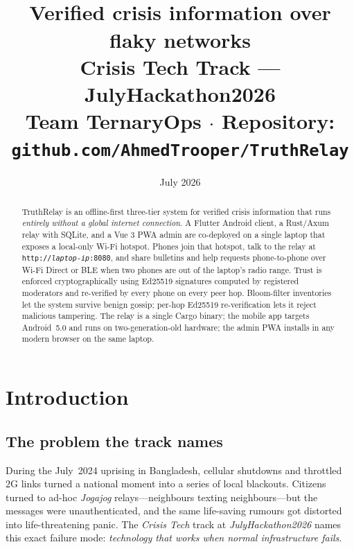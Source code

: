 \documentclass[11pt,a4paper]{article}
\title{
  \vspace{-2cm}
  {\Huge\bfseries \projectname\\[0.2cm]}
  \large Verified crisis information over flaky networks\\[0.4cm]
  \normalsize Crisis Tech Track --- JulyHackathon2026\\[0.2cm]
  \small Team TernaryOps $\cdot$ Repository: \texttt{github.com/AhmedTrooper/TruthRelay}
}
\author{}
\date{July 2026}
\newcommand{\projectname}{TruthRelay}
\begin{document}
\maketitle

\begin{abstract}
\noindent
\projectname{} is an offline-first three-tier system for verified
crisis information that runs \emph{entirely without a global internet
connection}. A Flutter Android client, a Rust/Axum relay with
SQLite, and a Vue 3 PWA admin are co-deployed on a single laptop
that exposes a local-only Wi-Fi hotspot. Phones join that hotspot,
talk to the relay at \texttt{http://\emph{laptop-ip}:8080}, and
share bulletins and help requests phone-to-phone over Wi-Fi Direct
or BLE when two phones are out of the laptop's radio range. Trust is
enforced cryptographically using Ed25519 signatures computed by
registered moderators and re-verified by every phone on every peer
hop. Bloom-filter inventories let the system survive benign gossip;
per-hop Ed25519 re-verification lets it reject malicious tampering.
The relay is a single Cargo binary; the mobile app targets
Android~5.0 and runs on two-generation-old hardware; the admin PWA
installs in any modern browser on the same laptop.
\end{abstract}

\vspace{0.4cm}

\section{Introduction}

\subsection{The problem the track names}
\label{sec:problem}

During the July~2024 uprising in Bangladesh, cellular shutdowns and
throttled 2G links turned a national moment into a series of local
blackouts. Citizens turned to ad-hoc \emph{Jogajog} relays---neighbours
texting neighbours---but the messages were unauthenticated, and the
same life-saving rumours got distorted into life-threatening panic.
The \emph{Crisis Tech} track at \emph{JulyHackathon2026} names this
exact failure mode: \emph{technology that works when normal
infrastructure fails}.
\end{document}
